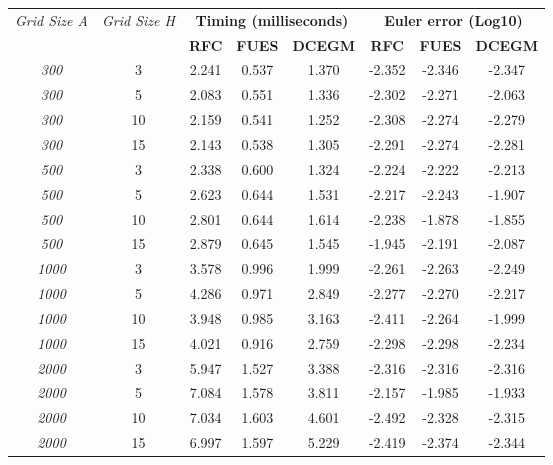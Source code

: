 \begin{table}[htbp]
\centering
\small
\begin{tabular}{ccccc|ccc}
\toprule
\multirow{2}{*}{\textit{Grid Size A}} & \multirow{2}{*}{\textit{Grid Size H}} & \multicolumn{3}{c}{\textbf{Timing (milliseconds)}} & \multicolumn{3}{c}{\textbf{Euler error (Log10)}} \\
 & & \textbf{RFC} & \textbf{FUES} & \textbf{DCEGM} & \textbf{RFC} & \textbf{FUES} & \textbf{DCEGM} \\
\midrule
\multirow{1}{*}{\textit{300}} & 3 & 2.241 & 0.537 & 1.370 & -2.352 & -2.346 & -2.347 \\
\midrule
\multirow{1}{*}{\textit{300}} & 5 & 2.083 & 0.551 & 1.336 & -2.302 & -2.271 & -2.063 \\
\midrule
\multirow{1}{*}{\textit{300}} & 10 & 2.159 & 0.541 & 1.252 & -2.308 & -2.274 & -2.279 \\
\midrule
\multirow{1}{*}{\textit{300}} & 15 & 2.143 & 0.538 & 1.305 & -2.291 & -2.274 & -2.281 \\
\multirow{1}{*}{\textit{500}} & 3 & 2.338 & 0.600 & 1.324 & -2.224 & -2.222 & -2.213 \\
\midrule
\multirow{1}{*}{\textit{500}} & 5 & 2.623 & 0.644 & 1.531 & -2.217 & -2.243 & -1.907 \\
\midrule
\multirow{1}{*}{\textit{500}} & 10 & 2.801 & 0.644 & 1.614 & -2.238 & -1.878 & -1.855 \\
\midrule
\multirow{1}{*}{\textit{500}} & 15 & 2.879 & 0.645 & 1.545 & -1.945 & -2.191 & -2.087 \\
\multirow{1}{*}{\textit{1000}} & 3 & 3.578 & 0.996 & 1.999 & -2.261 & -2.263 & -2.249 \\
\midrule
\multirow{1}{*}{\textit{1000}} & 5 & 4.286 & 0.971 & 2.849 & -2.277 & -2.270 & -2.217 \\
\midrule
\multirow{1}{*}{\textit{1000}} & 10 & 3.948 & 0.985 & 3.163 & -2.411 & -2.264 & -1.999 \\
\midrule
\multirow{1}{*}{\textit{1000}} & 15 & 4.021 & 0.916 & 2.759 & -2.298 & -2.298 & -2.234 \\
\multirow{1}{*}{\textit{2000}} & 3 & 5.947 & 1.527 & 3.388 & -2.316 & -2.316 & -2.316 \\
\midrule
\multirow{1}{*}{\textit{2000}} & 5 & 7.084 & 1.578 & 3.811 & -2.157 & -1.985 & -1.933 \\
\midrule
\multirow{1}{*}{\textit{2000}} & 10 & 7.034 & 1.603 & 4.601 & -2.492 & -2.328 & -2.315 \\
\midrule
\multirow{1}{*}{\textit{2000}} & 15 & 6.997 & 1.597 & 5.229 & -2.419 & -2.374 & -2.344 \\

\end{tabular}
\end{table}
